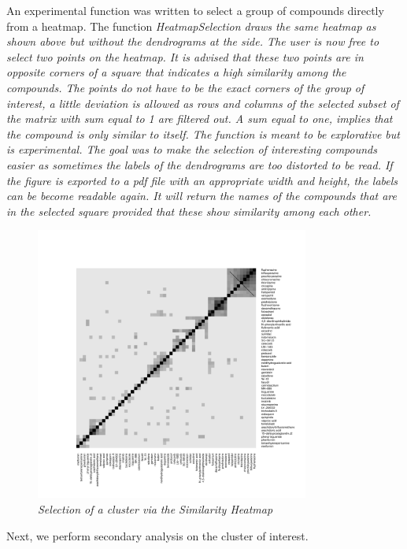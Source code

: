 \documentclass[a4paper]{article}
\begin{document}
\noindent An experimental function was written to select a group of compounds
directly from a heatmap. The function \it{HeatmapSelection} draws the same
heatmap as shown above but without the dendrograms at the side. The user is now
free to select two points on the heatmap. It is advised that these two points
are in opposite corners of a square that indicates a high similarity among the
compounds. The points do not have to be the exact corners of the group of
interest, a little deviation is allowed as rows and columns of the selected
subset of the matrix with sum equal to 1 are filtered out. A sum equal to one,
implies that the compound is only similar to itself. The function is meant to be
explorative but is experimental. The goal was to make the selection of
interesting compounds easier as sometimes the labels of the dendrograms are too
distorted to be read. If the figure is exported to a pdf file with an
appropriate width and height, the labels can be become readable again. It will
return the names of the compounds that are in the selected square provided that
these show similarity among each other.
\begin{Schunk}
\end{Schunk}
\vspace{-1.0cm}
\begin{figure}[H]
\centering
\includegraphics[width=9cm,height=9cm]{HeatmapSelection_MCF7W.pdf}
\caption{{\it Selection of a cluster via the Similarity Heatmap}\label{SimMap}}
\end{figure}
\noindent Next, we perform secondary analysis
on the cluster of interest.
\newpage
\end{document}
